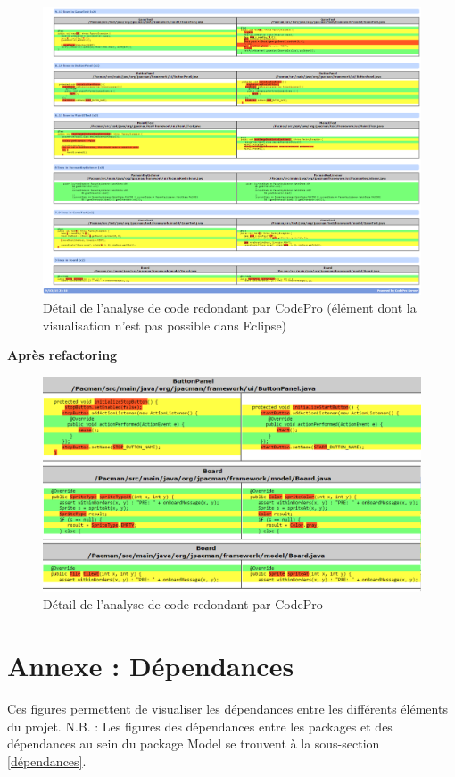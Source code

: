 \documentclass[12pt,a4paper,final]{article}
\newcommand{\smalltitle}[1]{\bigskip\large\textbf{#1}\par\normalsize\medskip}
\begin{document}
\begin{figure}[ht]
	\centering
	\includegraphics[width=\textwidth]{images/SimilarCode_5.png}
	\caption{\label{SimilarCode5}Détail de l'analyse de code redondant par CodePro (élément dont la visualisation n'est pas possible dans Eclipse)}
\end{figure}

\smalltitle{Après refactoring}
\begin{figure}[ht]
	\centering
	\includegraphics[width=\textwidth]{images/SimilarCode_7.png}
	\caption{\label{SimilarCode7}Détail de l'analyse de code redondant par CodePro}
\end{figure}

\clearpage
\newpage
\section{Annexe : Dépendances}\label{Dependencies}
Ces figures permettent de visualiser les dépendances entre les différents éléments du projet.
N.B. : Les figures des dépendances entre les packages et des dépendances au sein du package Model se trouvent à la sous-section \ref{dépendances}.
\end{document}

